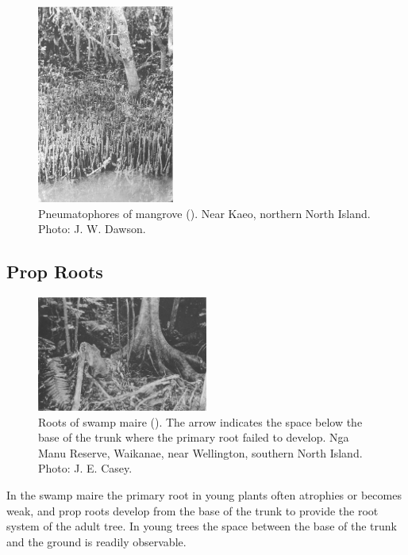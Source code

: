 \begin{figure}
	\includegraphics[width=0.4\textwidth]{graphics/figure13mangrove.jpg}
	\centering
	\caption[Pneumatophores of mangrove]{Pneumatophores of mangrove ().
	Near Kaeo, northern North Island.
	Photo:  J. W. Dawson.}%
	\label{fig:13mangrove}
\end{figure}

\subsection{Prop Roots}

\begin{figure}
	\includegraphics[width=0.5\textwidth]{graphics/figure14swampmaire.jpg}
	\centering
	\caption[Roots of swamp maire]{Roots of swamp maire ().
	The arrow indicates the space below the base of the trunk where the primary root failed to develop.
	Nga Manu Reserve, Waikanae, near Wellington, southern North Island.
	Photo:  J. E. Casey.}%
	\label{fig:14swampmaire}
\end{figure}

In the swamp maire the primary root in young plants often atrophies or becomes weak, and prop roots develop from the base of the trunk to provide the root system of the adult tree.
In young trees the space between the base of the trunk and the ground is readily observable.

